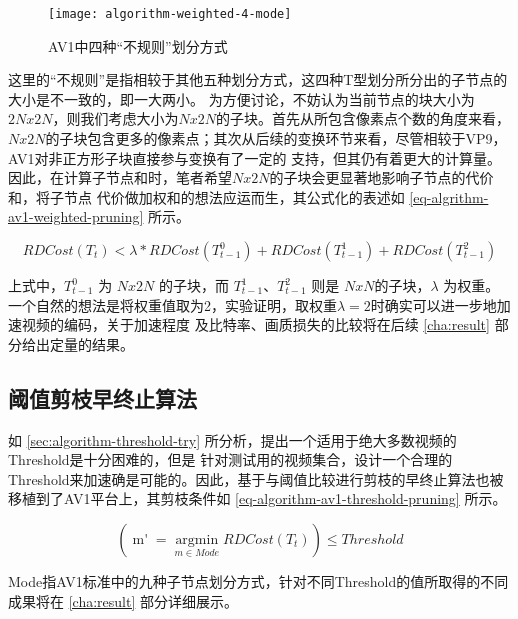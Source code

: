 \begin{figure}[H] %
  \centering
  \texttt{[image: algorithm-weighted-4-mode]}
  \caption{AV1中四种“不规则”划分方式}
  \label{fig:algorithm-weighted-4-mode}
\end{figure}

这里的“不规则”是指相较于其他五种划分方式，这四种T型划分所分出的子节点的大小是不一致的，即一大两小。
为方便讨论，不妨认为当前节点的块大小为$2Nx2N$，则我们考虑大小为$Nx2N$的子块。首先从所包含像素点个数的角度来看，
$Nx2N$的子块包含更多的像素点；其次从后续的变换环节来看，尽管相较于VP9，AV1对非正方形子块直接参与变换有了一定的
支持，但其仍有着更大的计算量。因此，在计算子节点和时，笔者希望$Nx2N$的子块会更显著地影响子节点的代价和，将子节点
代价做加权和的想法应运而生，其公式化的表述如 \ref{eq-algrithm-av1-weighted-pruning} 所示。

\begin{equation}
\label{eq-algrithm-av1-weighted-pruning}
RDCost(T_t) < \lambda * RDCost(T^0_{t-1}) + RDCost(T^1_{t-1}) + RDCost(T^2_{t-1})
\end{equation}

上式中，$T^0_{t-1}$ 为 $Nx2N$ 的子块，而 $T^1_{t-1}$、$T^2_{t-1}$ 则是 $NxN$的子块，$\lambda$ 为权重。
一个自然的想法是将权重值取为2，实验证明，取权重$\lambda = 2$时确实可以进一步地加速视频的编码，关于加速程度
及比特率、画质损失的比较将在后续 \ref{cha:result} 部分给出定量的结果。

\subsection{阈值剪枝早终止算法}

如 \ref{sec:algorithm-threshold-try} 所分析，提出一个适用于绝大多数视频的Threshold是十分困难的，但是
针对测试用的视频集合，设计一个合理的Threshold来加速确是可能的。因此，基于与阈值比较进行剪枝的早终止算法也被
移植到了AV1平台上，其剪枝条件如 \ref{eq-algorithm-av1-threshold-pruning} 所示。

\begin{equation}
\label{eq-algorithm-av1-threshold-pruning}
(\mathop{m'} =  \mathop{argmin}\limits_{m \in Mode} RDCost(T_t)) \le Threshold 
\end{equation}

Mode指AV1标准中的九种子节点划分方式，针对不同Threshold的值所取得的不同成果将在 \ref{cha:result} 部分详细展示。